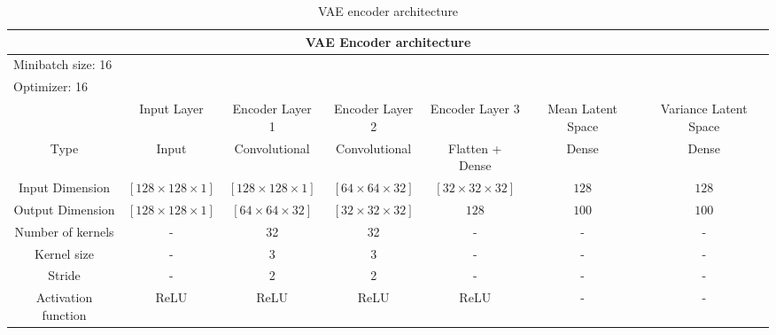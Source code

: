 \documentclass[11pt]{article}
\begin{document}
  \begin{table}[h!]
  \centering
  \begin{adjustbox}{max width=\textwidth}
  \begin{tabular}{*{7}{c}}%
  \hline
  \multicolumn{7}{c}{VAE Encoder architecture}
  \\
  \hline
  \multicolumn{7}{l}{Minibatch size: 16} \\
  \multicolumn{7}{l}{Optimizer: 16} \\
  \hline
   & Input Layer & Encoder Layer 1 & Encoder Layer 2 & Encoder Layer 3 & Mean Latent Space & Variance Latent Space \\
  \hline
  \hline
  Type & Input & Convolutional & Convolutional & Flatten + Dense & Dense & Dense \\
  \hline
  Input Dimension & $[128 \times 128 \times 1]$ & $[128 \times 128 \times 1]$ & $[64 \times 64 \times 32]$ & $[32 \times 32 \times 32]$ & $128$ & $128$ & \\
  \hline
  Output Dimension & $[128 \times 128 \times 1]$ & $[64 \times 64 \times 32]$ & $[32 \times 32 \times 32]$ & $128$ & $100$ & $100$ & \\
  \hline
  Number of kernels & - & 32 & 32 & - & - & - & \\
  \hline
  Kernel size & - & 3 & 3 & - & - & - & \\
  \hline
  Stride & - & 2 & 2 & - & - & - & \\
  \hline
  Activation function & ReLU & ReLU & ReLU & ReLU & - & - & \\
  \hline
\end{tabular}
\end{adjustbox}
  \caption{VAE encoder architecture}
  \label{tab:experiments_vae_encoder}
\end{table}
\end{document}
